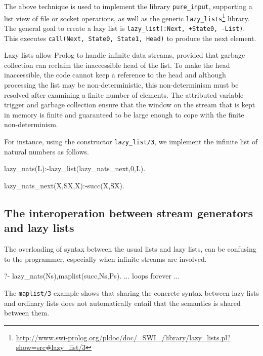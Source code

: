 \documentclass{new_tlp}
\begin{document}
The above technique is used to implement the library \texttt{pure\_input}, supporting a list view of file or socket operations, 
as well as the generic
\texttt{lazy\_lists}\footnote{\url{http://www.swi-prolog.org/pldoc/doc/_SWI_/library/lazy_lists.pl?show=src\#lazy_list/3}}
library. The general goal to create a lazy list is
\texttt{lazy\_list(:Next, +State0, -List)}. This executes
\texttt{call(Next, State0, State1, Head)} to produce the next element.

Lazy lists allow Prolog to handle infinite data streams,  provided that garbage
collection can reclaim the inaccessible head of the list. To make the
head inaccessible, the code cannot keep a reference to the head
and although processing the list may be non-deterministic,
this non-determinism must be resolved after examining a finite number of
elements.  The attributed variable trigger and garbage collection ensure
that the window on the stream that is kept in memory is finite and
guaranteed to be large enough to cope with the finite non-determinism.


For instance, 
using the constructor  {\tt lazy\_list/3}, we implement the infinite list of
natural numbers as follows.
\begin{code}
lazy_nats(L):-lazy_list(lazy_nats_next,0,L).

lazy_nats_next(X,SX,X):-succ(X,SX).
\end{code}


\subsection{The interoperation between stream generators and lazy lists}

The overloading of syntax between the usual lists and lazy lists, 
can be confusing to the
programmer, especially when infinite streams are involved.

\BX
\begin{codex}
?- lazy_nats(Ns),maplist(succ,Ns,Ps).
... loops forever ...
\end{codex}
\EX
The {\tt maplist/3} example
 shows that sharing the concrete syntax between lazy lists and  ordinary lists
does not automatically entail that the semantics is shared between them.
\end{document}
